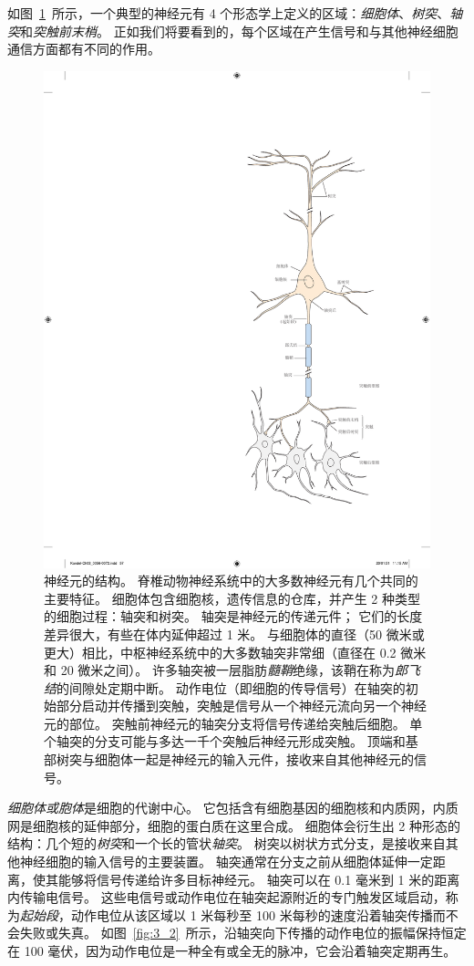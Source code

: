如图~\ref{fig:3_1}~所示，一个典型的神经元有 4 个形态学上定义的区域：\textit{细胞体}、\textit{树突}、\textit{轴突}和\textit{突触前末梢}。
正如我们将要看到的，每个区域在产生信号和与其他神经细胞通信方面都有不同的作用。


\begin{figure}[htbp]
	\centering
	\includegraphics[width=0.6\linewidth]{chap03/fig_3_1}
	\caption{神经元的结构。 
		脊椎动物神经系统中的大多数神经元有几个共同的主要特征。
		细胞体包含细胞核，遗传信息的仓库，并产生 2 种类型的细胞过程：轴突和树突。
		轴突是神经元的传递元件；
		它们的长度差异很大，有些在体内延伸超过 1 米。 
		与细胞体的直径（50 微米或更大）相比，中枢神经系统中的大多数轴突非常细（直径在 0.2 微米和 20 微米之间）。 
		许多轴突被一层脂肪\textit{髓鞘}绝缘，该鞘在称为\textit{郎飞结}的间隙处定期中断。 
		动作电位（即细胞的传导信号）在轴突的初始部分启动并传播到突触，突触是信号从一个神经元流向另一个神经元的部位。 
		突触前神经元的轴突分支将信号传递给突触后细胞。 
		单个轴突的分支可能与多达一千个突触后神经元形成突触。 	
		顶端和基部树突与细胞体一起是神经元的输入元件，接收来自其他神经元的信号。}
	\label{fig:3_1}
\end{figure}


\textit{细胞体或胞体}是细胞的代谢中心。 
它包括含有细胞基因的细胞核和内质网，内质网是细胞核的延伸部分，细胞的蛋白质在这里合成。
细胞体会衍生出 2 种形态的结构：几个短的\textit{树突}和一个长的管状\textit{轴突}。
树突以树状方式分支，是接收来自其他神经细胞的输入信号的主要装置。 
轴突通常在分支之前从细胞体延伸一定距离，使其能够将信号传递给许多目标神经元。
轴突可以在 0.1 毫米到 1 米的距离内传输电信号。 
这些电信号或动作电位在轴突起源附近的专门触发区域启动，称为\textit{起始段}，动作电位从该区域以 1 米每秒至 100 米每秒的速度沿着轴突传播而不会失败或失真。 
如图~\ref{fig:3_2}~所示，沿轴突向下传播的动作电位的振幅保持恒定在 100 毫伏，因为动作电位是一种全有或全无的脉冲，它会沿着轴突定期再生。


